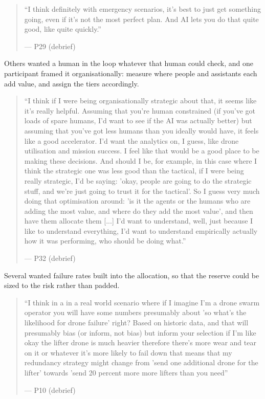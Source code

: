 \begin{quote}\small
``I think definitely with emergency scenarios, it's best to just get something going, even if it's not the most perfect plan. And AI lets you do that quite good, like quite quickly.''\par\hfill--- P29 (debrief)
\end{quote}

\label{sec:qual:who-decides:loop}
Others wanted a human in the loop whatever that human could check, and one participant framed it organisationally: measure where people and assistants each add value, and assign the tiers accordingly.

\begin{quote}\small
``I think if I were being organisationally strategic about that, it seems like it's really helpful. Assuming that you're human constrained (if you've got loads of spare humans, I'd want to see if the AI was actually better) but assuming that you've got less humans than you ideally would have, it feels like a good accelerator. I'd want the analytics on, I guess, like drone utilisation and mission success. I feel like that would be a good place to be making these decisions. And should I be, for example, in this case where I think the strategic one was less good than the tactical, if I were being really strategic, I'd be saying: 'okay, people are going to do the strategic stuff, and we're just going to trust it for the tactical'. So I guess very much doing that optimisation around: 'is it the agents or the humans who are adding the most value, and where do they add the most value', and then have them allocate them [...] I'd want to understand, well, just because I like to understand everything, I'd want to understand empirically actually how it was performing, who should be doing what.''\par\hfill--- P32 (debrief)
\end{quote}

\label{sec:qual:failure:blind}
Several wanted failure rates built into the allocation, so that the reserve could be sized to the risk rather than padded.

\begin{quote}\small
``I think in a in a real world scenario where if I imagine I'm a drone swarm operator you will have some numbers presumably about 'so what's the likelihood for drone failure' right? Based on historic data, and that will presumably bias (or inform, not bias) but inform your selection if I'm like okay the lifter drone is much heavier therefore there's more wear and tear on it or whatever it's more likely to fail down that means that my redundancy strategy might change from 'send one additional drone for the lifter' towards 'send 20 percent more more lifters than you need''\par\hfill--- P10 (debrief)
\end{quote}

